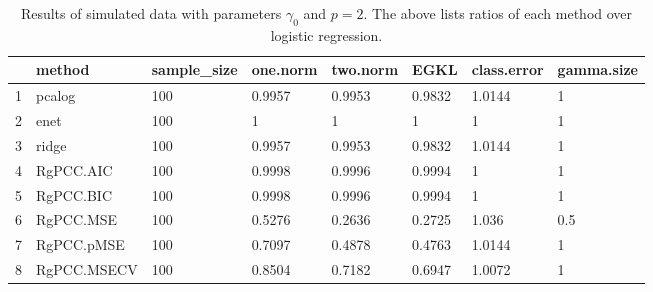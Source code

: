 \begin{table}[ht]
\centering
\begin{tabular}{rlllllll}
  \hline
 & method & sample\_size & one.norm & two.norm & EGKL & class.error & gamma.size \\ 
  \hline
1 & pcalog & 100 & 0.9957 & 0.9953 & 0.9832 & 1.0144 & 1 \\ 
  2 & enet & 100 & 1 & 1 & 1 & 1 & 1 \\ 
  3 & ridge & 100 & 0.9957 & 0.9953 & 0.9832 & 1.0144 & 1 \\ 
  4 & RgPCC.AIC & 100 & 0.9998 & 0.9996 & 0.9994 & 1 & 1 \\ 
  5 & RgPCC.BIC & 100 & 0.9998 & 0.9996 & 0.9994 & 1 & 1 \\ 
  6 & RgPCC.MSE & 100 & 0.5276 & 0.2636 & 0.2725 & 1.036 & 0.5 \\ 
  7 & RgPCC.pMSE & 100 & 0.7097 & 0.4878 & 0.4763 & 1.0144 & 1 \\ 
  8 & RgPCC.MSECV & 100 & 0.8504 & 0.7182 & 0.6947 & 1.0072 & 1 \\ 
   \hline
\end{tabular}
\caption{Results of simulated data with parameters $\gamma_0$ and $p =2$. The above lists ratios of each method over logistic regression.} 
\label{fig-0-debug-2-metrics-pratio}
\end{table}
